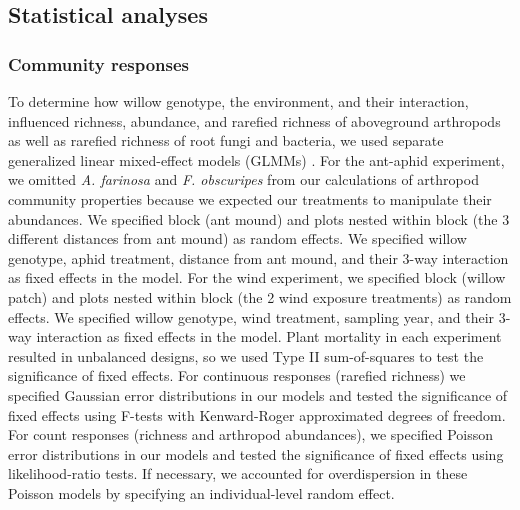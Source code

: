 \documentclass[11pt]{article}
\begin{document}
\subsection*{Statistical analyses}

\subsubsection*{Community responses}

To determine how willow genotype, the environment, and their
interaction, influenced richness, abundance, and rarefied richness of
aboveground arthropods as well as rarefied richness of root fungi and
bacteria, we used separate generalized linear mixed-effect models
(GLMMs) \cite{Bolker_2009}. For the ant-aphid experiment, we omitted
\emph{A. farinosa} and \emph{F. obscuripes} from our calculations of
arthropod community properties because we expected our treatments to
manipulate their abundances. We specified block (ant mound) and plots
nested within block (the 3 different distances from ant mound) as random
effects. We specified willow genotype, aphid treatment, distance from
ant mound, and their 3-way interaction as fixed effects in the model.
For the wind experiment, we specified block (willow patch) and plots
nested within block (the 2 wind exposure treatments) as random effects.
We specified willow genotype, wind treatment, sampling year, and their
3-way interaction as fixed effects in the model. Plant mortality in each
experiment resulted in unbalanced designs, so we used Type II
sum-of-squares to test the significance of fixed effects. For continuous
responses (rarefied richness) we specified Gaussian error distributions
in our models and tested the significance of fixed effects using F-tests
with Kenward-Roger approximated degrees of freedom. For count responses
(richness and arthropod abundances), we specified Poisson error
distributions in our models and tested the significance of fixed effects
using likelihood-ratio tests. If necessary, we accounted for
overdispersion in these Poisson models by specifying an individual-level
random effect.
\end{document}
